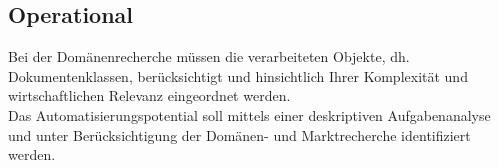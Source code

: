 \documentclass[11pt,oneside,a4paper,notitlepage]{article}
\begin{document}
%
\subsection{Operational}
\label{sec:zielhierarchie-operational}

Bei der Domänenrecherche müssen die verarbeiteten Objekte, dh. Dokumentenklassen, berücksichtigt und hinsichtlich Ihrer Komplexität 
und wirtschaftlichen Relevanz eingeordnet werden.\\
Das Automatisierungspotential soll mittels einer deskriptiven Aufgabenanalyse und unter Berücksichtigung der Domänen- und Marktrecherche identifiziert werden.\\ 






%
\end{document}
